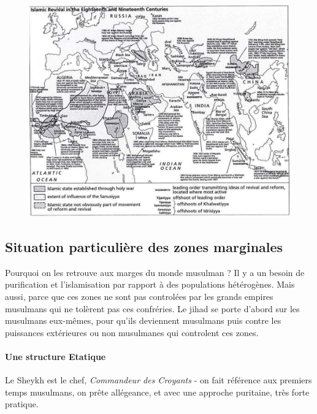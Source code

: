 \begin{figure}[h!]
    \centering
 \includegraphics[width=\textwidth]{CourantsIslamContemporain/ImagesCourantsIslamContemporain/image1.jpeg}

    \label{fig:le-renouveau-des-marges-du-monde-musulman-xviiie-xixe-siuxe8cle}
\end{figure}


\subsection{Situation particulière des zones marginales}


Pourquoi on les retrouve aux marges du monde musulman ? Il y a un besoin de purification et l'islamisation par rapport à des populations hétérogènes. Mais aussi, parce que ces zones ne sont pas controlées par les grands empires musulmans qui ne tolèrent pas ces confréries.
Le jihad se porte d'abord sur les musulmans eux-mêmes, pour qu'ils deviennent musulmans puis contre les puissances extérieures ou non musulmanes qui controlent ces zones. 

\paragraph{Une structure Etatique} Le Sheykh est le chef, \emph{Commandeur des Croyants} - on fait référence aux premiers temps musulmans, on prête allégeance, et avec une approche puritaine, très forte pratique. 

